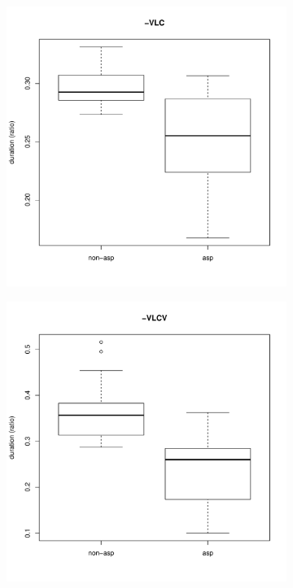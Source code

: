 \documentclass[11pt,a4paper,openany]{memoir}\usepackage[]{graphicx}\usepackage[]{color}
\newenvironment{knitrout}{}{} %
\begin{document}
\begin{figure}
\begin{subfigure}{.5\textwidth}
\begin{knitrout}
\end{knitrout}
\end{subfigure}
\begin{subfigure}{.5\textwidth}
\centering
\begin{knitrout}
\color{fgcolor}
\includegraphics[width=\textwidth]{img/mono-lat-box-1} 

\end{knitrout}
\end{subfigure}
\begin{subfigure}{.5\textwidth}
\centering
\begin{knitrout}
\color{fgcolor}
\includegraphics[width=\textwidth]{img/di-lat-box-1} 


\end{knitrout}
\end{subfigure}
\end{figure}
\end{document}
